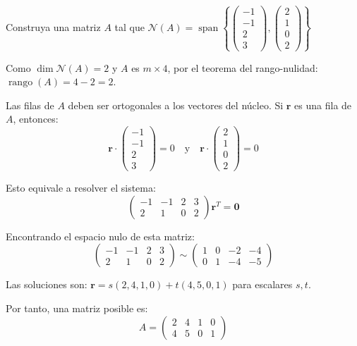\begin{prob} Construya una matriz $A$ tal que $\mathcal{N}(A) = \operatorname{span}\left\{ \begin{pmatrix}-1\\-1\\2\\3\end{pmatrix}, \begin{pmatrix}2\\1\\0\\2\end{pmatrix} \right\}$

\begin{myproof}
Como $\dim \mathcal{N}(A) = 2$ y $A$ es $m \times 4$, por el teorema del rango-nulidad: $\operatorname{rango}(A) = 4 - 2 = 2$.

Las filas de $A$ deben ser ortogonales a los vectores del núcleo. Si $\mathbf{r}$ es una fila de $A$, entonces:
$$\mathbf{r} \cdot \begin{pmatrix}-1\\-1\\2\\3\end{pmatrix} = 0 \quad \text{y} \quad \mathbf{r} \cdot \begin{pmatrix}2\\1\\0\\2\end{pmatrix} = 0$$

Esto equivale a resolver el sistema:
$$\begin{pmatrix}-1 & -1 & 2 & 3 \\ 2 & 1 & 0 & 2\end{pmatrix} \mathbf{r}^T = \mathbf{0}$$

Encontrando el espacio nulo de esta matriz:
$$\begin{pmatrix}-1 & -1 & 2 & 3 \\ 2 & 1 & 0 & 2\end{pmatrix} \sim \begin{pmatrix}1 & 0 & -2 & -4 \\ 0 & 1 & -4 & -5\end{pmatrix}$$

Las soluciones son: $\mathbf{r} = s(2,4,1,0) + t(4,5,0,1)$ para escalares $s,t$.

Por tanto, una matriz posible es:
$$A = \begin{pmatrix} 2 & 4 & 1 & 0 \\ 4 & 5 & 0 & 1 \end{pmatrix}$$
\end{myproof}
\end{prob}

